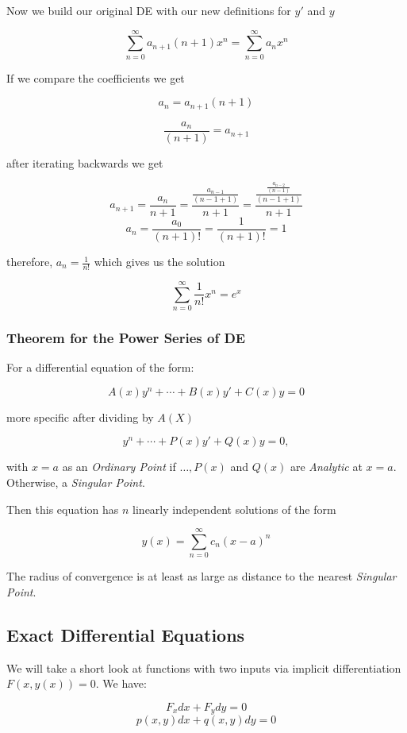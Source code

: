 Now we build our original DE with our new definitions for \(y'\) and \(y\)

\[
    \sum_{n = 0}^{\infty} a_{n + 1}(n + 1)x^{n} = \sum_{n = 0}^{\infty} a_n x^n
\]

If we compare the coefficients we get

\[
    a_n = a_{n+1}(n+1)
\]

\[
    \frac{a_n}{(n + 1)} = a_{n+1}
\]

after iterating backwards we get

\[
    a_{n + 1} = \frac{a_n}{n + 1} = \frac{\frac{a_{n - 1}}{(n - 1 +1)}}{n + 1} = 
    \frac{\frac{\frac{a_{n - 2}}{(n - 1)}}{(n - 1 + 1)}}{n + 1}   
\]
\[
    a_n = \frac{a_0}{(n + 1)!} = \frac{1}{(n + 1)!} = 1
\]

therefore, \(a_n = \frac{1}{n!}\) which gives us the solution

\[
    \sum_{n = 0}^{\infty}\frac{1}{n!}x^n = e^x
\]

\subsubsection{Theorem for the Power Series of DE}

For a differential equation of the form:

\[
    A(x)y^{n} + \cdots + B(x)y' + C(x)y = 0
\]

more specific after dividing by \(A(X)\)

\[
    y^{n} + \cdots + P(x)y' + Q(x)y = 0,
\]

with \(x = a\) as an \emph{Ordinary Point} if \(\dots, P(x)\) and \(Q(x)\) are 
\emph{Analytic} at \(x = a\). Otherwise, a \emph{Singular Point}.

Then this equation has \(n\) linearly independent solutions of the form

\[
    y(x) = \sum_{n = 0}^{\infty} c_n {(x - a)}^n
\]

The radius of convergence is at least as large as distance to the nearest \emph{Singular Point}.

\subsection{Exact Differential Equations}

We will take a short look at functions with two inputs via implicit differentiation \(F(x,y(x)) = 0\).
We have:

\[
    F_x dx + F_y dy = 0
\]
\[
    p(x,y)dx + q(x,y)dy = 0
\]

